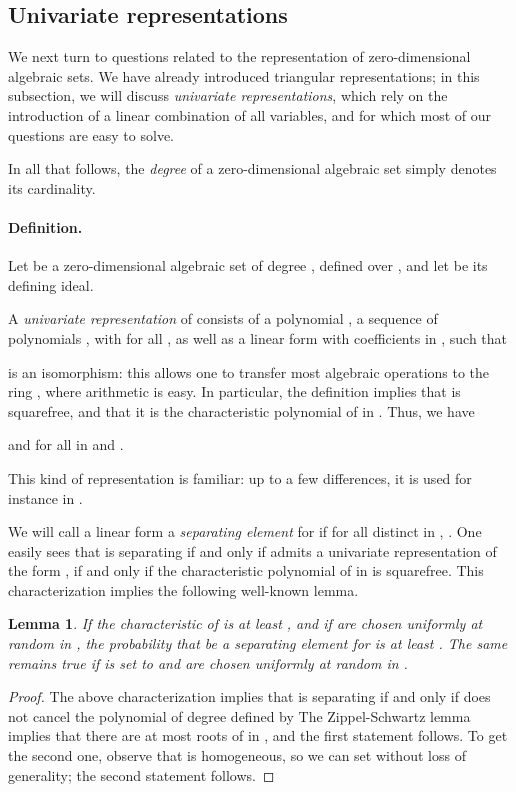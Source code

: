 \documentclass[12pt]{article}
\newtheorem{Lemma}{Lemma}
\begin{document}
\subsection{Univariate representations}\label{ssec:uni}

We next turn to questions related to the representation of
zero-dimensional algebraic sets. We have already introduced triangular
representations; in this subsection, we will discuss {\em univariate
  representations}, which rely on the introduction of a linear
combination of all variables, and for which most of our questions are
easy to solve.

In all that follows, the {\em degree}  of a zero-dimensional
algebraic set  simply denotes its cardinality.

\paragraph{Definition.}
Let  be a zero-dimensional algebraic set of degree
, defined over , and let  be its defining ideal.

A {\em univariate representation}  of  consists of
a polynomial , a sequence of polynomials
, with  for all
, as well as a linear form  with
coefficients in , such that

is an isomorphism: this allows one to transfer most algebraic
operations to the ring , where arithmetic is
easy. In particular, the definition implies that  is squarefree,
and that it is the characteristic polynomial of  in .
Thus, we have

and  for all  in  and .

This kind of representation is familiar: up to a few differences, it
is used for instance in
\cite{GiMo89,AlBeRoWo96,Rouillier99,GiHeMoPa95,GiLeSa01}.

We will call a linear form  a {\em
  separating element} for  if for all distinct  in ,
. One easily sees that  is separating if and
only if  admits a univariate representation of the form
, if and only if the characteristic polynomial  of
 in  is squarefree. This characterization implies the
following well-known lemma.
\begin{Lemma}\label{lemma:prob}
  If the characteristic of  is at least , and if
   are chosen uniformly at random in , the probability that  be a separating element for  is at least
  . The same remains true if  is set to  and
   are chosen uniformly at random in .
\end{Lemma}
\begin{proof}
  The above characterization implies that  is separating if and
  only if  does not cancel the polynomial
   of degree  defined by
   The
  Zippel-Schwartz lemma implies that there are at most 
  roots of  in , and the first statement
  follows. To get the second one, observe that  is
  homogeneous, so we can set  without loss of generality; the
  second statement follows.
\end{proof}
\end{document}
